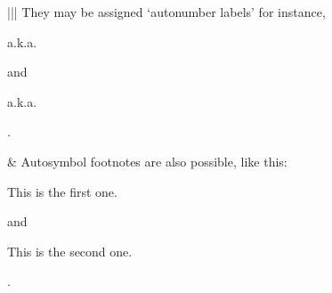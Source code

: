 \documentclass[letterpaper,10pt,english]{sphinxmanual}
\begin{document}
\begin{savenotes}
\begin{tabular}[t]{|*{2}{|}}
They may be assigned ‘autonumber
labels’ \sphinxhyphen{} for instance,
%
\begin{footnote}[20]\sphinxAtStartFootnote
a.k.a. {\hyperref[\detokenize{rst-cheatsheet/rst-cheatsheet:fourth}]{}}
%
\end{footnote} and %
\begin{footnote}[19]\sphinxAtStartFootnote
a.k.a. {\hyperref[\detokenize{rst-cheatsheet/rst-cheatsheet:third}]{}}
%
\end{footnote}.
\\
\hline
\begin{sphinxVerbatimintable}[commandchars=\\\{\}]
   
   \PYG{p}{[}\PYG{p}{]}  \PYG{p}{[}\PYG{p}{]}

 \PYG{p}{[}\PYG{p}{]}     
 \PYG{p}{[}\PYG{p}{]}     
\end{sphinxVerbatimintable}
&
Auto\sphinxhyphen{}symbol footnotes are also
possible, like this: %
\begin{footnote}[21]\sphinxAtStartFootnote
This is the first one.
%
\end{footnote} and %
\begin{footnote}[22]\sphinxAtStartFootnote
This is the second one.
%
\end{footnote}.
\\
\hline
\begin{sphinxVerbatimintable}[commandchars=\\\{\}]
   \PYG{p}{[}\PYG{p}{]}
    
     
 

 \PYG{p}{[}\PYG{p}{]}  
       


\end{sphinxVerbatimintable}
\end{tabular}
\end{savenotes}
\end{document}
